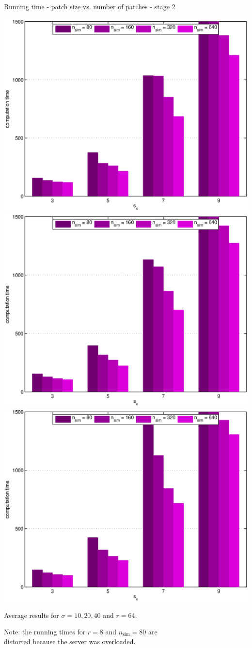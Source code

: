 \documentclass[mathserif, 8pt]{beamer}
\makeatletter
\newcounter{multipleslide}
\newcommand{\restoreframe}{%
\patchcmd{\beamer@@tmpl@footline}%
	{\themultipleslide}%
	{\insertframenumber}%
	{}%
	{}%
\setcounter{framenumber}{\value{multipleslide}}%
}
\makeatother
\begin{document}
\begin{frame}{Running time - patch size vs. number of patches - stage 2}
	\begin{center}
		\includegraphics[width=.33\textwidth]{time_px2-np2-bars_2r64_s10_average.eps}%
		\includegraphics[width=.33\textwidth]{time_px2-np2-bars_2r64_s20_average.eps}%
		\includegraphics[width=.33\textwidth]{time_px2-np2-bars_2r64_s40_average.eps}
	\end{center}
	\begin{center}
	Average results for $\sigma = 10, 20, 40$ and $r = 64$.

	\bigskip

	Note: the running times for $r = 8$ and $n_{\text{sim}} = 80$ are \\
	distorted because the server was overloaded.
	\end{center}
\end{frame}
\restoreframe
\end{document}
